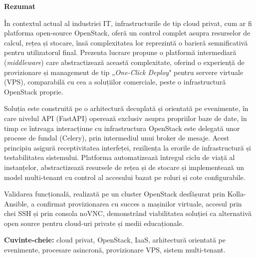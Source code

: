 \newpage
\begin{center}
    \LARGE
    \textbf{\thesistitle}
    
    \vspace{0.5cm}
    
    \authornamefl
    
    \vspace{1cm}
    
    \textbf{Rezumat}
    
    \vspace{1cm}
\end{center}


În contextul actual al industriei IT, infrastructurile de tip cloud privat, cum ar fi platforma open-source OpenStack, oferă un control complet asupra resurselor de calcul, rețea și stocare, însă complexitatea lor reprezintă o barieră semnificativă pentru utilizatorul final. Prezenta lucrare propune o platformă intermediară (\textit{middleware}) care abstractizează această complexitate, oferind o experiență de provizionare și management de tip „\textit{One-Click Deploy}" pentru servere virtuale (VPS), comparabilă cu cea a soluțiilor comerciale, peste o infrastructură OpenStack proprie.

Soluția este construită pe o arhitectură decuplată și orientată pe evenimente, în care nivelul API (FastAPI) operează exclusiv asupra propriilor baze de date, în timp ce întreaga interacțiune cu infrastructura OpenStack este delegată unor procese de fundal (Celery), prin intermediul unui broker de mesaje. Acest principiu asigură receptivitatea interfeței, reziliența la erorile de infrastructură și testabilitatea sistemului. Platforma automatizează întregul ciclu de viață al instanțelor, abstractizează resursele de rețea și de stocare și implementează un model multi-tenant cu control al accesului bazat pe roluri și cote configurabile.

Validarea funcțională, realizată pe un cluster OpenStack desfășurat prin Kolla-Ansible, a confirmat provizionarea cu succes a mașinilor virtuale, accesul prin chei SSH și prin consola noVNC, demonstrând viabilitatea soluției ca alternativă open source pentru cloud-uri private și medii educaționale.

\vspace{0.5cm}
\noindent\textbf{Cuvinte-cheie:} cloud privat, OpenStack, IaaS, arhitectură orientată pe evenimente, procesare asincronă, provizionare VPS, sistem multi-tenant.